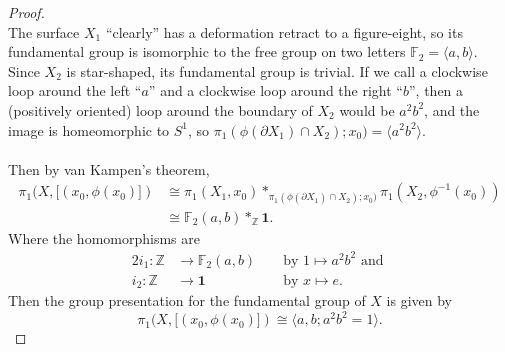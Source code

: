 \documentclass{article}
\begin{document}
\begin{proof} \text{} \\
  The surface $X_1$ ``clearly'' has a deformation retract to a figure-eight, so
  its fundamental group is isomorphic to the free group on two letters $\mathbb F_2 = \langle a, b\rangle$.
  Since $X_2$ is star-shaped, its fundamental group is trivial.
  If we call a clockwise loop around the left ``$a$'' and a clockwise
  loop around the right ``$b$'', then a (positively oriented) loop around the
  boundary of $X_2$ would be $a^2b^2$, and the image is homeomorphic to $S^1$, so
  $\pi_1(\phi(\partial X_1) \cap X_2); x_0) = \langle a^2b^2 \rangle$.
  \\~\\
  Then by van Kampen's theorem, \begin{align*}
    \pi_1(X, [(x_0, \phi(x_0)])
    &\cong \pi_1(X_1, x_0) *_{\pi_1(\phi(\partial X_1) \cap X_2); x_0)} \pi_1(X_2, \phi^{-1}(x_0)) \\
    &\cong  \mathbb F_2(a, b) *_{\mathbb Z} \mathbf{1}.
  \end{align*}
  Where the homomorphisms are \begin{alignat*}{2}
    i_1\colon \mathbb Z &\rightarrow \mathbb F_2(a, b) &&\text{ by } 1 \mapsto a^2b^2 \text{ and } \\
    i_2\colon \mathbb Z &\rightarrow \mathbf 1         &&\text{ by } x \mapsto e.
  \end{alignat*}
  Then the group presentation for the fundamental group of $X$ is given by \[
    \pi_1(X, [(x_0, \phi(x_0)]) \cong \langle a, b; a^2b^2 = 1 \rangle.
  \]
\end{proof}
\pagebreak
\end{document}
